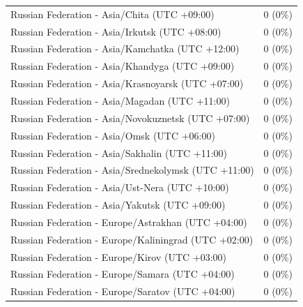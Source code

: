 \documentclass[
  english,
  man]{apa6}
\begin{document}
\begin{appendix}
\begin{table}
{\begin{tabular}[t]{ll}
\hspace{1em}Russian Federation - Asia/Chita (UTC +09:00) & 0 (0\%)\\
\hspace{1em}Russian Federation - Asia/Irkutsk (UTC +08:00) & 0 (0\%)\\
\addlinespace
\hspace{1em}Russian Federation - Asia/Kamchatka (UTC +12:00) & 0 (0\%)\\
\hspace{1em}Russian Federation - Asia/Khandyga (UTC +09:00) & 0 (0\%)\\
\hspace{1em}Russian Federation - Asia/Krasnoyarsk (UTC +07:00) & 0 (0\%)\\
\hspace{1em}Russian Federation - Asia/Magadan (UTC +11:00) & 0 (0\%)\\
\hspace{1em}Russian Federation - Asia/Novokuznetsk (UTC +07:00) & 0 (0\%)\\
\addlinespace
\hspace{1em}Russian Federation - Asia/Omsk (UTC +06:00) & 0 (0\%)\\
\hspace{1em}Russian Federation - Asia/Sakhalin (UTC +11:00) & 0 (0\%)\\
\hspace{1em}Russian Federation - Asia/Srednekolymsk (UTC +11:00) & 0 (0\%)\\
\hspace{1em}Russian Federation - Asia/Ust-Nera (UTC +10:00) & 0 (0\%)\\
\hspace{1em}Russian Federation - Asia/Yakutsk (UTC +09:00) & 0 (0\%)\\
\addlinespace
\hspace{1em}Russian Federation - Europe/Astrakhan (UTC +04:00) & 0 (0\%)\\
\hspace{1em}Russian Federation - Europe/Kaliningrad (UTC +02:00) & 0 (0\%)\\
\hspace{1em}Russian Federation - Europe/Kirov (UTC +03:00) & 0 (0\%)\\
\hspace{1em}Russian Federation - Europe/Samara (UTC +04:00) & 0 (0\%)\\
\hspace{1em}Russian Federation - Europe/Saratov (UTC +04:00) & 0 (0\%)\\

\end{tabular}}
\end{table}
\end{appendix}
\end{document}
